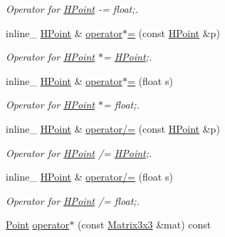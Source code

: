 \begin{DoxyCompactItemize}
\begin{DoxyCompactList}\small\item\em Operator for \hyperlink{class_h_point}{H\+Point} -\/= float;. \end{DoxyCompactList}\item 
\hypertarget{class_h_point_a821dfc65bc17abdfefc46b500272bc6f}{inline\+\_\+ \hyperlink{class_h_point}{H\+Point} \& \hyperlink{class_h_point_a821dfc65bc17abdfefc46b500272bc6f}{operator$\ast$=} (const \hyperlink{class_h_point}{H\+Point} \&p)}\label{class_h_point_a821dfc65bc17abdfefc46b500272bc6f}

\begin{DoxyCompactList}\small\item\em Operator for \hyperlink{class_h_point}{H\+Point} $\ast$= \hyperlink{class_h_point}{H\+Point};. \end{DoxyCompactList}\item 
\hypertarget{class_h_point_a92fab606277095841cf6bd6c9a709ed3}{inline\+\_\+ \hyperlink{class_h_point}{H\+Point} \& \hyperlink{class_h_point_a92fab606277095841cf6bd6c9a709ed3}{operator$\ast$=} (float s)}\label{class_h_point_a92fab606277095841cf6bd6c9a709ed3}

\begin{DoxyCompactList}\small\item\em Operator for \hyperlink{class_h_point}{H\+Point} $\ast$= float;. \end{DoxyCompactList}\item 
\hypertarget{class_h_point_a6f344d8b5dafa320336651cd8373d184}{inline\+\_\+ \hyperlink{class_h_point}{H\+Point} \& \hyperlink{class_h_point_a6f344d8b5dafa320336651cd8373d184}{operator/=} (const \hyperlink{class_h_point}{H\+Point} \&p)}\label{class_h_point_a6f344d8b5dafa320336651cd8373d184}

\begin{DoxyCompactList}\small\item\em Operator for \hyperlink{class_h_point}{H\+Point} /= \hyperlink{class_h_point}{H\+Point};. \end{DoxyCompactList}\item 
\hypertarget{class_h_point_aedac2fd0b37b024b932760c2b2df8f21}{inline\+\_\+ \hyperlink{class_h_point}{H\+Point} \& \hyperlink{class_h_point_aedac2fd0b37b024b932760c2b2df8f21}{operator/=} (float s)}\label{class_h_point_aedac2fd0b37b024b932760c2b2df8f21}

\begin{DoxyCompactList}\small\item\em Operator for \hyperlink{class_h_point}{H\+Point} /= float;. \end{DoxyCompactList}\item 
\hypertarget{class_h_point_a530bbf4cc9ab6469b64613cfeb7360b6}{\hyperlink{class_point}{Point} \hyperlink{class_h_point_a530bbf4cc9ab6469b64613cfeb7360b6}{operator$\ast$} (const \hyperlink{class_matrix3x3}{Matrix3x3} \&mat) const }\label{class_h_point_a530bbf4cc9ab6469b64613cfeb7360b6}


\end{DoxyCompactItemize}

